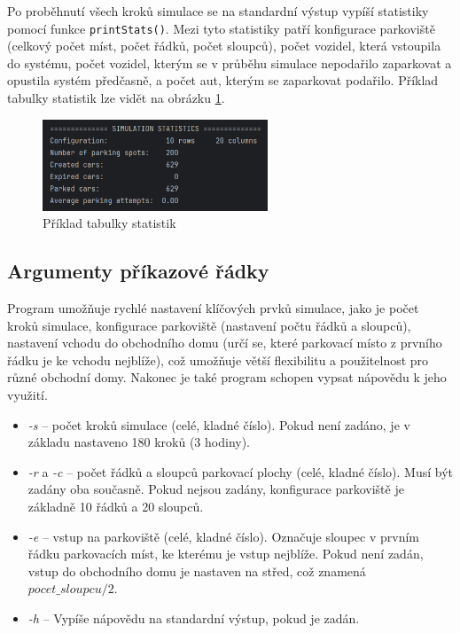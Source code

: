 \documentclass[11pt, a4paper]{article}
\begin{document}
\bigskip

\noindent Po proběhnutí všech kroků simulace se na standardní výstup vypíší statistiky pomocí funk\-ce \texttt{printStats()}. Mezi tyto statistiky patří konfigurace parkoviště (celkový počet míst, počet řádků, počet sloupců), počet vozidel, která vstoupila do systému, počet vozidel, kterým se v průběhu simulace nepodařilo zaparkovat a opustila systém předčasně, a počet aut, kterým se zaparkovat podařilo. Příklad tabulky statistik lze vidět na obrázku \ref{statistics}.

\begin{figure}[ht]
  \centering
  \includegraphics[width=0.6\textwidth]{img/statistics.png}
  \caption{Příklad tabulky statistik}
  \label{statistics}
\end{figure}

\subsection{Argumenty příkazové řádky}
\label{arguments}

Program umožňuje rychlé nastavení klíčových prvků simulace, jako je počet kroků simulace, konfigurace parkoviště (nastavení počtu řádků a sloupců), nastavení vchodu do obchodního domu (určí se, které parkovací místo z prvního řádku je ke vchodu nejblíže), což umožňuje větší flexibilitu a použitelnost pro různé obchodní domy. Nakonec je také program schopen vypsat nápovědu k jeho využití.

\begin{itemize}
    \item \emph{-s} -- počet kroků simulace (celé, kladné číslo). Pokud není zadáno, je v základu nastaveno 180 kroků (3 hodiny).
    \item \emph{-r} a \emph{-c} -- počet řádků a sloupců parkovací plochy (celé, kladné číslo). Musí být zadány oba současně. Pokud nejsou zadány, konfigurace parkoviště je základně 10 řádků a 20 sloupců.
    \item \emph{-e} -- vstup na parkoviště (celé, kladné číslo). Označuje sloupec v prvním řádku parkovacích míst, ke kterému je vstup nejblíže. Pokud není zadán, vstup do obchodního domu je nastaven na střed, což znamená $ pocet\_sloupcu / 2 $.
    \item \emph{-h} -- Vypíše nápovědu na standardní výstup, pokud je zadán.
\end{itemize}
\end{document}
